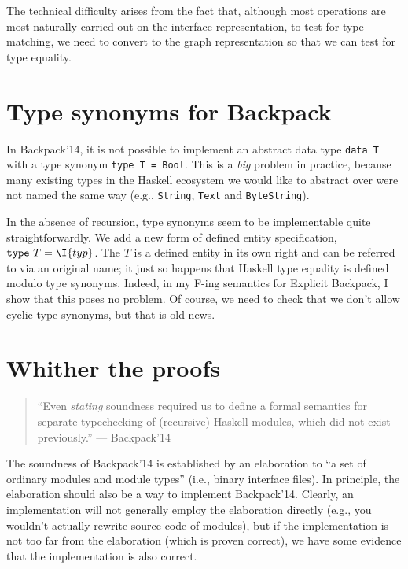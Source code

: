 \noindent
The technical difficulty arises from the fact that, although most operations
are most naturally carried out on the interface representation, to
test for type matching, we need to convert to the graph representation
so that we can test for type equality.

\iffalse{}

\section{Type synonyms for Backpack}

In Backpack'14, it is not possible to implement an abstract
data type \verb|data T| with a type synonym \verb|type T = Bool|.
This is a \emph{big} problem in practice, because many existing
types in the Haskell ecosystem we would like to abstract over
were not named the same way (e.g., \verb|String|, \verb|Text|
and \verb|ByteString|).

In the absence of recursion, type synonyms seem to be implementable
quite straightforwardly.  We add a new form of defined entity
specification, $\verb|type|~T = \I{typ}$.  The $T$ is a defined
entity in its own right and can be referred to via an original
name; it just so happens that Haskell type equality is defined
modulo type synonyms.  Indeed, in my F-ing semantics for Explicit
Backpack, I show that this poses no problem.  Of course, we need to
check that we don't allow cyclic type synonyms, but that is old news.

\section{Whither the proofs}

\begin{quote}
``Even \emph{stating} soundness required us to define a formal semantics
for separate typechecking of (recursive) Haskell modules, which did not
exist previously.'' --- Backpack'14
\end{quote}

\noindent
The soundness of Backpack'14 is established by an elaboration to ``a set
of ordinary modules and module types'' (i.e., binary interface files).
In principle, the elaboration should also be a way to implement
Backpack'14.  Clearly, an implementation will not generally employ the
elaboration directly (e.g., you wouldn't actually rewrite source
code of modules), but if the implementation is not too far from
the elaboration (which is proven correct), we have some evidence
that the implementation is also correct.

